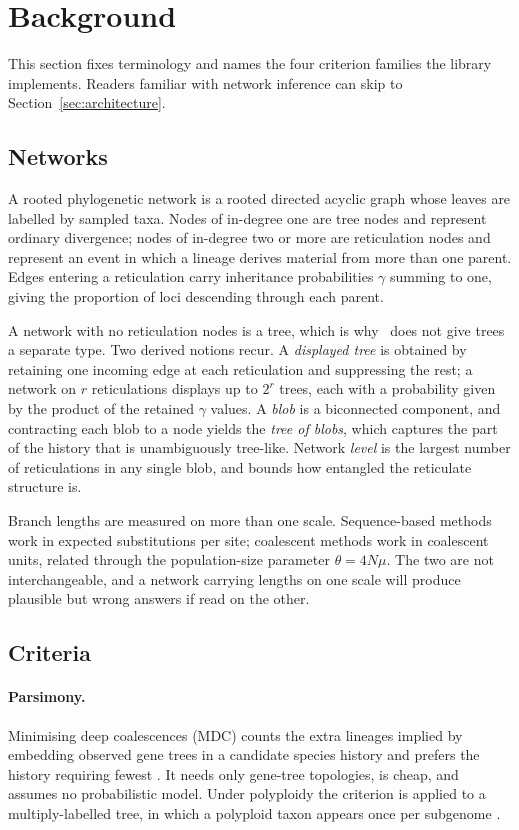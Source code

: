\section{Background}
\label{sec:background}

This section fixes terminology and names the four criterion families the library
implements. Readers familiar with network inference can skip to
Section~\ref{sec:architecture}.

\subsection{Networks}

A rooted phylogenetic network is a rooted directed acyclic graph whose leaves are
labelled by sampled taxa. Nodes of in-degree one are tree nodes and represent
ordinary divergence; nodes of in-degree two or more are reticulation nodes and
represent an event in which a lineage derives material from more than one parent.
Edges entering a reticulation carry inheritance probabilities $\gamma$ summing to
one, giving the proportion of loci descending through each parent.

A network with no reticulation nodes is a tree, which is why \phynetpy\ does not
give trees a separate type. Two derived notions recur. A \emph{displayed tree} is
obtained by retaining one incoming edge at each reticulation and suppressing the
rest; a network on $r$ reticulations displays up to $2^r$ trees, each with a
probability given by the product of the retained $\gamma$ values. A \emph{blob}
is a biconnected component, and contracting each blob to a node yields the
\emph{tree of blobs}, which captures the part of the history that is unambiguously
tree-like. Network \emph{level} is the largest number of reticulations in any
single blob, and bounds how entangled the reticulate structure is.

Branch lengths are measured on more than one scale. Sequence-based methods work
in expected substitutions per site; coalescent methods work in coalescent units,
related through the population-size parameter $\theta = 4N\mu$. The two are not
interchangeable, and a network carrying lengths on one scale will produce
plausible but wrong answers if read on the other.

\subsection{Criteria}

\paragraph{Parsimony.} Minimising deep coalescences (MDC) counts the extra
lineages implied by embedding observed gene trees in a candidate species history
and prefers the history requiring fewest \cite{Than2009MDC}. It needs only
gene-tree topologies, is cheap, and assumes no probabilistic model. Under
polyploidy the criterion is applied to a multiply-labelled tree, in which a
polyploid taxon appears once per subgenome \cite{Yan2022Allop}.

